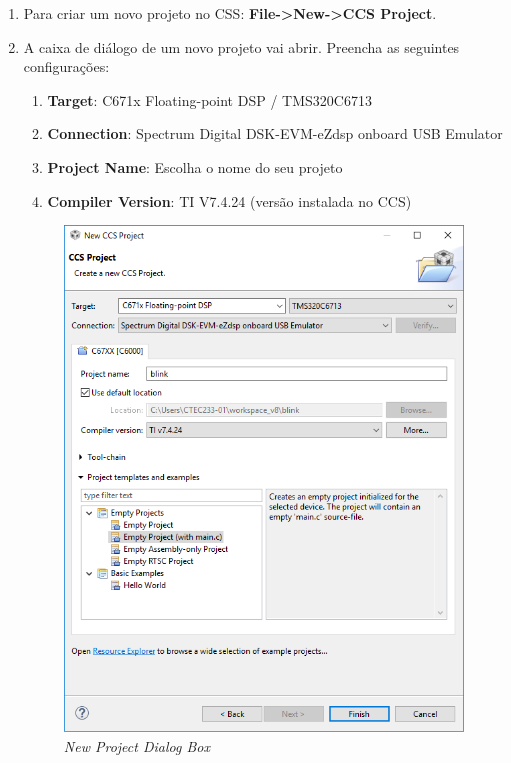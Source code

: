 \documentclass[a4paper, 12pt]{article}
\begin{document}
\begin{enumerate}
\item Para criar um novo projeto no CSS: \textbf{File->New->CCS Project}.
\item A caixa de diálogo de um novo projeto vai abrir. Preencha as seguintes configurações:

 \begin{enumerate}
 	\item \textbf{Target}: C671x Floating-point DSP / TMS320C6713
 	\item \textbf{Connection}: Spectrum Digital DSK-EVM-eZdsp onboard USB Emulator
 	\item \textbf{Project Name}: Escolha o nome do seu projeto
 	\item \textbf{Compiler Version}: TI V7.4.24 (versão instalada no CCS)
 \end{enumerate}
 
 \begin{figure}[htbp!] 
 	\begin{center}
 		\includegraphics[scale=0.7]{css_new_project.png}
 		\caption{\textit{New Project Dialog Box}}
 		\label{Fig:dsproject}
 	\end{center} 
 \end{figure}
 

\end{enumerate}
\end{document}
